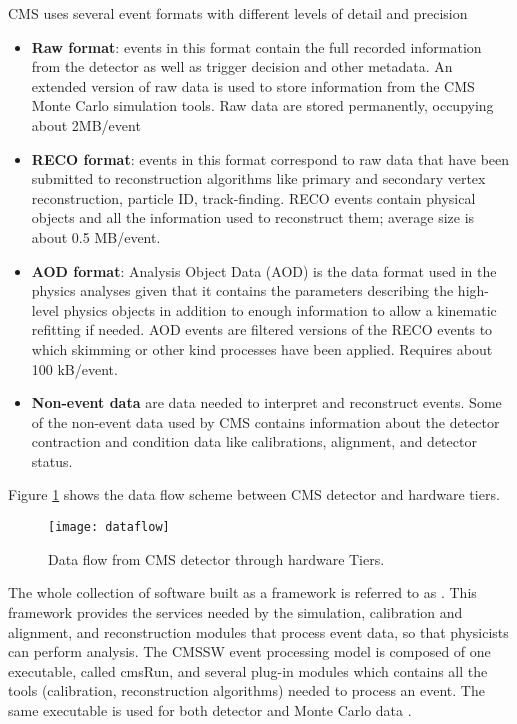 \noindent CMS uses several event formats with different levels of detail and precision

\begin{itemize}
\item \textbf{Raw format}: events in this format contain the full recorded information from the detector as well as trigger decision and other metadata. An extended version of raw data is used to store information from the CMS Monte Carlo simulation tools. Raw data are stored permanently, occupying about 2MB/event   
\item \textbf{RECO format}: events in this format correspond to raw data that have been submitted to reconstruction algorithms like primary and secondary vertex reconstruction, particle ID, track-finding. RECO events contain physical objects and all the information used to reconstruct them; average size is about 0.5 MB/event.     
\item \textbf{AOD format}: Analysis Object Data (AOD) is the data format used in the physics analyses given that it contains the parameters describing the high-level physics objects in addition to enough information to allow a kinematic refitting if needed. AOD events are filtered versions of the RECO events to which skimming or other kind processes have been applied. Requires about 100 kB/event.
\item \textbf{Non-event data} are data needed to interpret and reconstruct events. Some of the non-event data used by CMS contains information about the detector contraction and condition data like calibrations, alignment, and detector status.  
\end{itemize}

\noindent Figure \ref{fig:dataflow} shows the data flow scheme between CMS detector and hardware tiers.

\begin{figure}[h!]
  \centering
  \texttt{[image: dataflow]}
  \caption[Data flow from CMS detector through hardware Tiers]{Data flow from CMS detector through hardware Tiers.}
  \label{fig:dataflow}
\end{figure}


\noindent  The whole collection of software built as a framework is referred to as . This framework provides the services needed by the simulation, calibration and alignment, and reconstruction modules that process event data, so that physicists can perform analysis. The CMSSW event processing model is composed of one executable, called cmsRun, and several plug-in modules which contains all the tools  (calibration, reconstruction algorithms) needed to process an event. The same executable is used for both detector and Monte Carlo data \cite{cmssw}.
